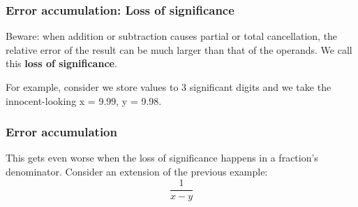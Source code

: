 \documentclass[notes]{beamer}
\begin{document}
\begin{frame}
	\frametitle{Error accumulation: Loss of significance}
	Beware: when addition or subtraction causes partial or total cancellation, the
	relative error of the result can be much larger than that of the operands. We
	call this \textbf{loss of significance}.
	
	For example, consider we store values to 3 significant digits and we take the
	innocent-looking x = 9.99, y = 9.98. 
	
\end{frame}


\begin{frame}
	\frametitle{Error accumulation}
	This gets even worse when the loss of significance happens in a fraction's denominator. Consider an extension of the previous example:
	\begin{equation*}
		\frac{1}{x - y}
	\end{equation*}
	
\end{frame}
\end{document}
